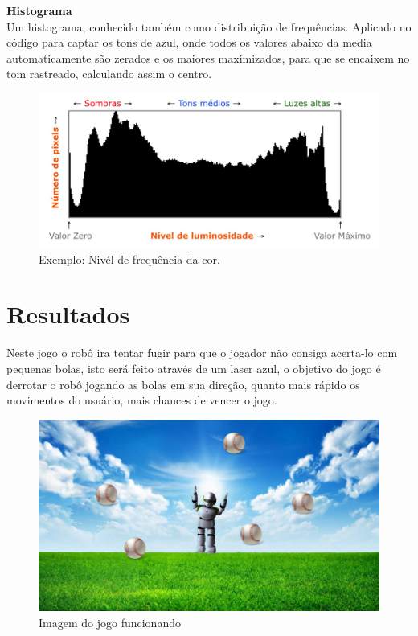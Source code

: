 \documentclass{sciposter}
\begin{document}
\begin{multicols}{3}
\textbf{Histograma} \\

Um histograma, conhecido também como distribuição de frequências. Aplicado no código para captar os tons de azul, onde todos os valores abaixo da media automaticamente são zerados e os maiores maximizados, para que se encaixem no tom rastreado, calculando assim o centro.

\begin{figure}[!htb]
\centering
\includegraphics[scale=0.4]{histograma.jpg}
\caption{Exemplo: Nivél de frequência da cor.}
\end{figure}



\section{Resultados }

Neste jogo o robô ira tentar fugir para que o jogador não consiga acerta-lo com pequenas bolas, 
isto será feito através de um laser azul, o objetivo do jogo é derrotar o robô jogando as bolas em sua direção, quanto mais rápido os movimentos do usuário, mais chances de vencer o jogo.

\vspace{0.7cm}

\begin{figure}[!htb]
\centering
\includegraphics[scale=0.7]{fundo.jpg}
\caption{Imagem do jogo funcionando}
\end{figure}


\end{multicols}
\end{document}
